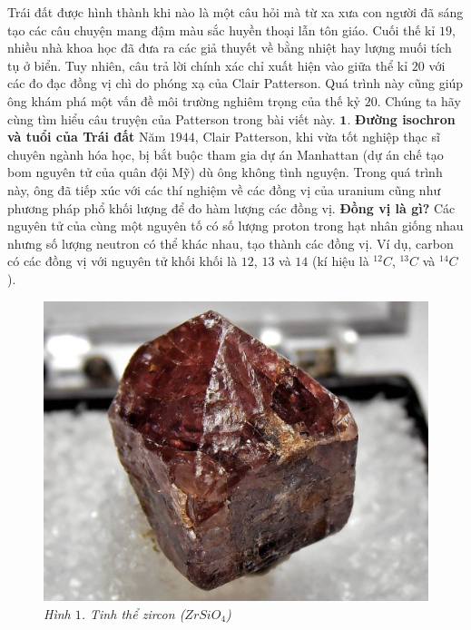 \begin{multicols}{2}
	Trái đất được hình thành khi nào là một câu hỏi mà từ xa xưa con người đã sáng tạo các câu chuyện mang đậm màu sắc huyền thoại lẫn tôn giáo. Cuối thế kỉ $19$, nhiều nhà khoa học đã đưa ra các giả thuyết về bằng nhiệt hay lượng muối tích tụ ở biển. Tuy nhiên, câu trả lời chính xác chỉ xuất hiện vào giữa thể kỉ $20$ với các đo đạc đồng vị chì do phóng xạ của Clair Patterson. Quá trình này cũng giúp ông khám phá một vấn đề môi trường nghiêm trọng của thế kỷ $20$. Chúng ta hãy cùng tìm hiểu câu truyện của Patterson trong bài viết này.
	\vskip 0.1cm
	$\pmb{1.}$ \textbf{\color{timhieukhoahoc}Đường isochron và tuổi của Trái đất}
	\vskip 0.1cm
	Năm $1944$, Clair Patterson, khi vừa tốt nghiệp thạc sĩ chuyên ngành hóa học, bị bắt buộc tham gia dự án Manhattan (dự án chế tạo bom nguyên tử của quân đội Mỹ) dù ông không tình nguyện. Trong quá trình này, ông đã tiếp xúc với các thí nghiệm về các đồng vị của uranium cũng như phương pháp phổ khối lượng để đo hàm lượng các đồng vị.
	\vskip 0.1cm
	\textbf{\color{timhieukhoahoc}Đồng vị là gì?}
	\vskip 0.1cm
	Các nguyên tử của cùng một nguyên tố có số lượng proton trong hạt nhân giống nhau nhưng số lượng neutron có thể khác nhau, tạo thành các đồng vị. Ví dụ, carbon có các đồng vị với nguyên tử khối khối là $12$, $13$ và $14$ (kí hiệu là $^{12}{C}$, $^{13}{C}$ và $^{14}{C}$).
	\begin{figure}[H]
		\vspace*{-5pt}
		\centering
		\captionsetup{labelformat= empty, justification=centering}
		\includegraphics[width= 1\linewidth]{1}
		\caption{\small\textit{\color{timhieukhoahoc}Hình $1$. Tinh thể zircon (${ZrSiO}_4$)}}

\end{figure}
\end{multicols}
